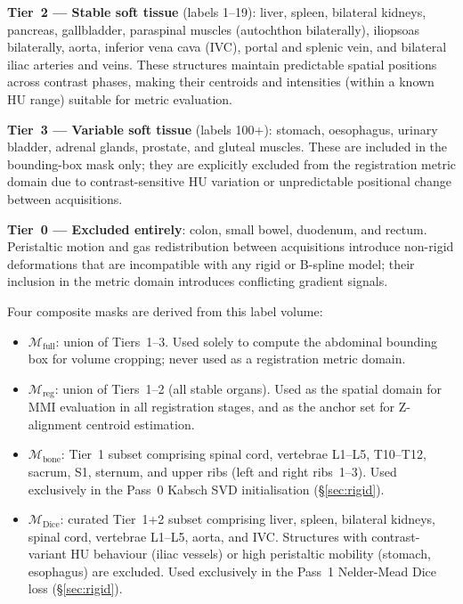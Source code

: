 \documentclass[10pt,twocolumn]{article}
\newcommand{\Mfull}{\mathcal{M}_{\text{full}}}
\newcommand{\Mreg}{\mathcal{M}_{\text{reg}}}
\newcommand{\Mbone}{\mathcal{M}_{\text{bone}}}
\newcommand{\Mdice}{\mathcal{M}_{\text{Dice}}}
\begin{document}
\noindent\textbf{Tier~2 — Stable soft tissue} (labels 1--19): liver,
spleen, bilateral kidneys, pancreas, gallbladder, paraspinal muscles
(autochthon bilaterally), iliopsoas bilaterally, aorta, inferior vena
cava (IVC), portal and splenic vein, and bilateral iliac arteries and
veins.
These structures maintain predictable spatial positions across contrast
phases, making their centroids and intensities (within a known HU
range) suitable for metric evaluation.

\noindent\textbf{Tier~3 — Variable soft tissue} (labels 100+): stomach,
oesophagus, urinary bladder, adrenal glands, prostate, and gluteal
muscles.
These are included in the bounding-box mask only; they are explicitly
excluded from the registration metric domain due to contrast-sensitive
HU variation or unpredictable positional change between acquisitions.

\noindent\textbf{Tier~0 — Excluded entirely}: colon, small bowel,
duodenum, and rectum.
Peristaltic motion and gas redistribution between acquisitions introduce
non-rigid deformations that are incompatible with any rigid or B-spline
model; their inclusion in the metric domain introduces conflicting
gradient signals.

\medskip
\noindent Four composite masks are derived from this label volume:

\begin{itemize}
  \item $\Mfull$: union of Tiers~1--3. Used solely to compute the
  abdominal bounding box for volume cropping; never used as a
  registration metric domain.

  \item $\Mreg$: union of Tiers~1--2 (all stable organs). Used as
  the spatial domain for MMI evaluation in all registration stages,
  and as the anchor set for Z-alignment centroid estimation.

  \item $\Mbone$: Tier~1 subset comprising spinal cord, vertebrae
  L1--L5, T10--T12, sacrum, S1, sternum, and upper ribs (left and
  right ribs~1--3). Used exclusively in the Pass~0 Kabsch SVD
  initialisation (\S\ref{sec:rigid}).

  \item $\Mdice$: curated Tier~1+2 subset comprising liver, spleen,
  bilateral kidneys, spinal cord, vertebrae L1--L5, aorta, and IVC.
  Structures with contrast-variant HU behaviour (iliac vessels) or
  high peristaltic mobility (stomach, esophagus) are excluded.
  Used exclusively in the Pass~1 Nelder-Mead Dice loss
  (\S\ref{sec:rigid}).
\end{itemize}
\end{document}

